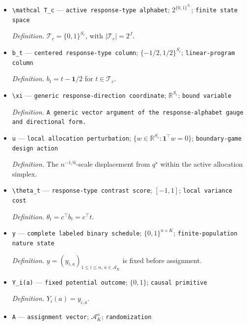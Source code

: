 \documentclass{article}
\begin{document}
\begin{itemize}
  \par\smallskip\noindent\emph{Definition.} A vector \(t=(t_a)_{a\in S_c}\) of arm-specific binary potential outcomes.
  \item \texttt{\textbackslash{}\allowbreak{}mathcal T\_\allowbreak{}c} --- \texttt{active response-\allowbreak{}type alphabet}; \(2^{\{0,1\}^{S_c}}\); \texttt{finite state space}
  \par\smallskip\noindent\emph{Definition.} \(\mathcal T_c=\{0,1\}^{S_c}\), with \(|\mathcal T_c|=2^J\).
  \item \texttt{b\_\allowbreak{}t} --- \texttt{centered response-\allowbreak{}type column}; \(\{-1/2,1/2\}^{S_c}\); \texttt{linear-\allowbreak{}program column}
  \par\smallskip\noindent\emph{Definition.} \(b_t=t-\mathbf 1/2\) for \(t\in\mathcal T_c\).
  \item \texttt{\textbackslash{}\allowbreak{}xi} --- \texttt{generic response-\allowbreak{}direction coordinate}; \(\mathbb R^{S_c}\); \texttt{bound variable}
  \par\smallskip\noindent\emph{Definition.} \texttt{A generic vector argument of the response-\allowbreak{}alphabet gauge and directional form.}
  \item \texttt{u} --- \texttt{local allocation perturbation}; \(\{w\in\mathbb R^{S_c}:\mathbf 1^\top w=0\}\); \texttt{boundary-\allowbreak{}game design action}
  \par\smallskip\noindent\emph{Definition.} The \(n^{-1/6}\)-scale displacement from \(q^\star\) within the active allocation simplex.
  \item \texttt{\textbackslash{}\allowbreak{}theta\_\allowbreak{}t} --- \texttt{response-\allowbreak{}type contrast score}; \([-1,1]\); \texttt{local variance cost}
  \par\smallskip\noindent\emph{Definition.} \(\theta_t=c^\top b_t=c^\top t\).
  \item \texttt{y} --- \texttt{complete labeled binary schedule}; \(\{0,1\}^{n\times K}\); \texttt{finite-\allowbreak{}population nature state}
  \par\smallskip\noindent\emph{Definition.} \(y=(y_{i,a})_{1\le i\le n,\,a\in\mathcal A_K}\) is fixed before assignment.
  \item \texttt{Y\_\allowbreak{}i(a)} --- \texttt{fixed potential outcome}; \(\{0,1\}\); \texttt{causal primitive}
  \par\smallskip\noindent\emph{Definition.} \(Y_i(a)=y_{i,a}\).
  \item \texttt{A} --- \texttt{assignment vector}; \(\mathcal A_K^n\); \texttt{randomization}

\end{itemize}
\end{document}
